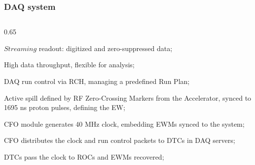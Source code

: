 \documentclass{beamer}
\begin{document}
\begin{frame}
    \frametitle{DAQ system}
\begin{columns}
    \begin{column}{0.65\framewidth}
        \vspace{-3mm}
        \setlength{\leftmargini}{1.2em}
    \begin{itemize} 
   {\footnotesize     \item $Streaming$ readout: digitized and zero-suppressed data; 
        \vspace{-0.5mm}
        \item High data throughput, flexible for analysis; 
        \vspace{-0.5mm}
        \item DAQ run control via RCH, managing a 
        predefined Run Plan; 
        \vspace{-0.5mm}
        \item Active spill defined by RF Zero-Crossing Markers 
        from the Accelerator, synced to \\ 1695 ns proton pulses, defining the EW; 
        \vspace{-0.5mm}
        \item CFO module generates 40 MHz clock, embedding EWMs synced to the system; 
        \vspace{-0.5mm}
        \item CFO distributes the clock and run control packets to DTCs in DAQ servers; 
        \vspace{-0.5mm}
        \item DTCs pass the clock to ROCs and EWMs recovered; 
   
       
   
}
\end{itemize}
\end{column}
\end{columns}
\end{frame}
\end{document}
